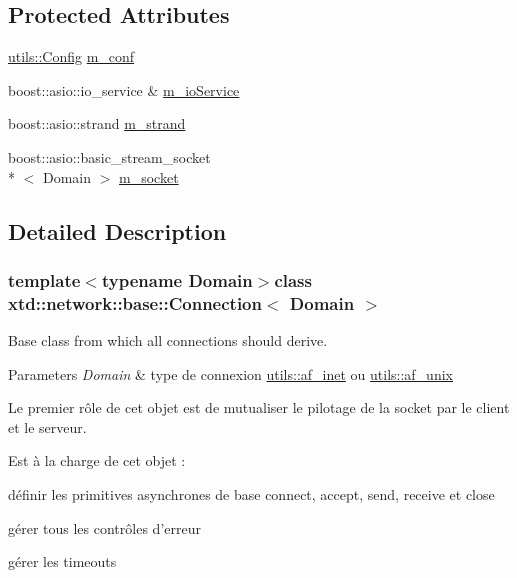 \subsection*{Protected Attributes}
\begin{DoxyCompactItemize}
\item 
\hyperlink{classxtd_1_1network_1_1utils_1_1Config}{utils\-::\-Config} \hyperlink{classxtd_1_1network_1_1base_1_1Connection_a84f0cc65067a6d89a087754ad658f00b}{m\-\_\-conf}
\item 
boost\-::asio\-::io\-\_\-service \& \hyperlink{classxtd_1_1network_1_1base_1_1Connection_aee549e0f84206cc897371ec3ba2cba49}{m\-\_\-io\-Service}
\item 
boost\-::asio\-::strand \hyperlink{classxtd_1_1network_1_1base_1_1Connection_afdbd7eaed6dc0b71b05a6ef3be2f417d}{m\-\_\-strand}
\item 
boost\-::asio\-::basic\-\_\-stream\-\_\-socket\\*
$<$ Domain $>$ \hyperlink{classxtd_1_1network_1_1base_1_1Connection_af054fe7efb3d4f8a1a0f40c0e74e8c70}{m\-\_\-socket}
\end{DoxyCompactItemize}


\subsection{Detailed Description}
\subsubsection*{template$<$typename Domain$>$class xtd\-::network\-::base\-::\-Connection$<$ Domain $>$}

Base class from which all connections should derive. 


\begin{DoxyParams}{Parameters}
{\em Domain} & type de connexion \hyperlink{namespacextd_1_1network_1_1utils_a6238bab7a616eda8c9424721444a18d1}{utils\-::af\-\_\-inet} ou \hyperlink{namespacextd_1_1network_1_1utils_a60e83921a2d026f07b49fa094988acdf}{utils\-::af\-\_\-unix}\\
\hline
\end{DoxyParams}
Le premier rôle de cet objet est de mutualiser le pilotage de la socket par le client et le serveur.

Est à la charge de cet objet \-:
\begin{DoxyItemize}
\item définir les primitives asynchrones de base connect, accept, send, receive et close
\item gérer tous les contrôles d'erreur
\item gérer les timeouts
\end{DoxyItemize}

